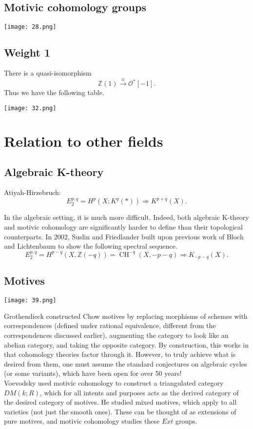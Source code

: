 \documentclass[a4paper, 11pt]{article} %
\theoremstyle{remark}
\newcommand{\?}{{\color{red} ???}}
\newcommand{\mb}{\mathbb}
\newcommand{\mc}{\mathcal}
\newcommand{\Z}{\mb{Z}}
\DeclareMathOperator{\CH}{CH}
\begin{document}
\subsection{Motivic cohomology groups}

\texttt{[image: 28.png]} 

\subsection{Weight 1} 
There is a quasi-isomorphism 
\[
\Z(1)\xrightarrow{\cong}\mc{O}^*[-1].
\]
Thus we have the following table.

\texttt{[image: 32.png]} 
 

\section{Relation to other fields} 
\subsection{Algebraic K-theory}
Atiyah-Hirzebruch: 
\[E_2^{p, q}=H^p(X; K^q(*))\Rightarrow K^{p+q}(X).\]

In the algebraic setting, it is much more difficult.  Indeed, both algebraic K-theory and motivic cohomology are significantly harder to define than their topological counterparts.  In 2002, Suslin and Friedlander built upon previous work of Bloch and Lichtenbaum to show the following spectral sequence. 
\[
E_2^{p,q}=H^{p-q}(X, \Z(-q))=\CH^{-q}(X, -p-q)\Rightarrow K_{-p-q}(X).
\]
\subsection{Motives} 
\texttt{[image: 39.png]} 

Grothendieck constructed Chow motives by replacing morphisms of schemes with correspondences (defined under rational equivalence, different from the correspondences discussed earlier), augmenting the category to look like an abelian category, and taking the opposite category.  By construction, this works in that cohomology theories factor through it.  However, to truly achieve what is desired from them, one must assume the standard conjectures on algebraic cycles (or some variants), which have been open for over 50 years! \\ 

Voevodsky used motivic cohomology to construct a triangulated category $DM(k; R)$, which for all intents and purposes acts as the derived category of the desired category of motives.  He studied mixed motives, which apply to all varieties (not just the smooth ones).  These can be thought of as extensions of pure motives, and motivic cohomology studies these $Ext$ groups.  
\end{document}
